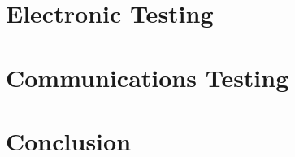 \documentclass[a4paper,11pt]{report}
\let\Oldsection\section
\renewcommand{\section}{\FloatBarrier\Oldsection}
\begin{document}
\chapter{Electronic Testing} \label{sec_Electro Testing}


\chapter{Communications Testing} \label{sec_Comms Testing}


\chapter{Conclusion}


\clearpage
\leading{17pt}
\printbibliography[heading=bibintoc]

\clearpage
{}
\begin{appendices}
\graphicspath{{./Sections/PDFs/}}
\addappheadtotoc





\end{appendices}
\end{document}
